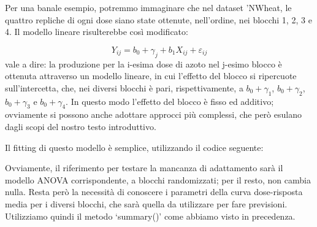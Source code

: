 \documentclass[a4paper,12pt,oneside]{book}
\newenvironment{Shaded}{\begin{snugshade}}{\end{snugshade}}
\newcommand{\DecValTok}[1]{#1}
\newcommand{\SpecialCharTok}[1]{#1}
\newcommand{\CommentTok}[1]{#1}
\newcommand{\OtherTok}[1]{#1}
\newcommand{\FunctionTok}[1]{#1}
\newcommand{\AttributeTok}[1]{#1}
\newcommand{\NormalTok}[1]{#1}
\begin{document}
Per una banale esempio, potremmo immaginare che nel dataset 'NWheat, le quattro repliche di ogni dose siano state ottenute, nell'ordine, nei blocchi 1, 2, 3 e 4. Il modello lineare risulterebbe così modificato:

\[Y_{ij} = b_0 + \gamma_j + b_1 X_{ij} + \varepsilon_{ij}\]
vale a dire: la produzione per la i-esima dose di azoto nel j-esimo blocco è ottenuta attraverso un modello lineare, in cui l'effetto del blocco si ripercuote sull'intercetta, che, nei diversi blocchi è pari, rispettivamente, a \(b_0 + \gamma_1\), \(b_0 + \gamma_2\), \(b_0 + \gamma_3\) e \(b_0 + \gamma_4\). In questo modo l'effetto del blocco è fisso ed additivo; ovviamente si possono anche adottare approcci più complessi, che però esulano dagli scopi del nostro testo introduttivo.

Il fitting di questo modello è semplice, utilizzando il codice seguente:

\begin{Shaded}
\end{Shaded}

Ovviamente, il riferimento per testare la mancanza di adattamento sarà il modello ANOVA corrispondente, a blocchi randomizzati; per il resto, non cambia nulla. Resta però la necessità di conoscere i parametri della curva dose-risposta media per i diversi blocchi, che sarà quella da utilizzare per fare previsioni. Utilizziamo quindi il metodo `summary()' come abbiamo visto in precedenza.
\end{document}

